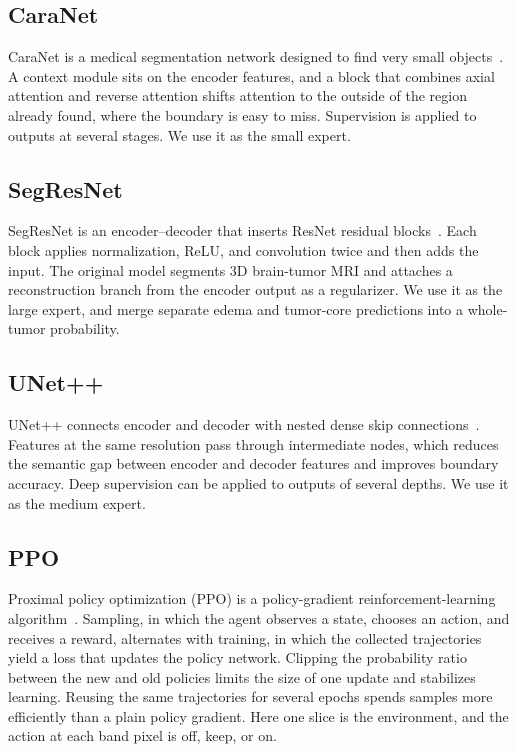 \documentclass[runningheads]{llncs}
\begin{document}
\subsection{CaraNet}
CaraNet is a medical segmentation network designed to find very small objects~\cite{lou2023}. A context module sits on the encoder features, and a block that combines axial attention and reverse attention shifts attention to the outside of the region already found, where the boundary is easy to miss. Supervision is applied to outputs at several stages. We use it as the small expert.

\subsection{SegResNet}
SegResNet is an encoder--decoder that inserts ResNet residual blocks~\cite{myronenko2018}. Each block applies normalization, ReLU, and convolution twice and then adds the input. The original model segments 3D brain-tumor MRI and attaches a reconstruction branch from the encoder output as a regularizer. We use it as the large expert, and merge separate edema and tumor-core predictions into a whole-tumor probability.

\subsection{UNet++}
UNet++ connects encoder and decoder with nested dense skip connections~\cite{zhou2019}. Features at the same resolution pass through intermediate nodes, which reduces the semantic gap between encoder and decoder features and improves boundary accuracy. Deep supervision can be applied to outputs of several depths. We use it as the medium expert.

\subsection{PPO}
Proximal policy optimization (PPO) is a policy-gradient reinforcement-learning algorithm~\cite{schulman2017}. Sampling, in which the agent observes a state, chooses an action, and receives a reward, alternates with training, in which the collected trajectories yield a loss that updates the policy network. Clipping the probability ratio between the new and old policies limits the size of one update and stabilizes learning. Reusing the same trajectories for several epochs spends samples more efficiently than a plain policy gradient. Here one slice is the environment, and the action at each band pixel is off, keep, or on.
\end{document}
